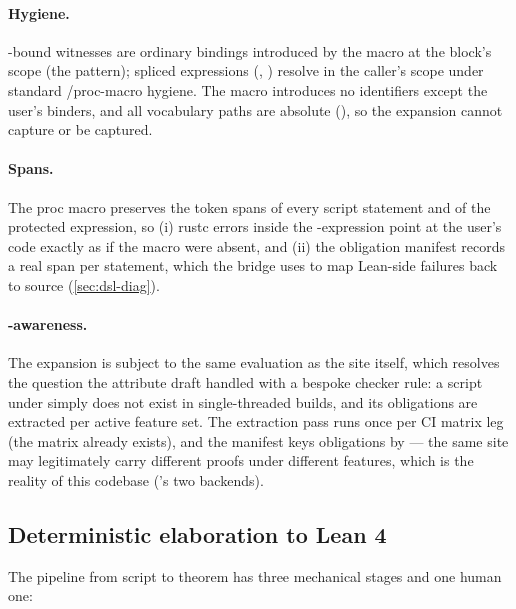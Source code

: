 \paragraph{Hygiene.} -bound witnesses are ordinary
 bindings introduced by the macro at the block's scope
(the   pattern); spliced expressions
(, ) resolve in the caller's scope
under standard /proc-macro hygiene. The macro
introduces no identifiers except the user's binders, and all
vocabulary paths are absolute (), so
the expansion cannot capture or be captured.

\paragraph{Spans.} The proc macro preserves the token spans of every
script statement and of the protected expression, so (i) rustc errors
inside the -expression point at the user's code exactly as
if the macro were absent, and (ii) the obligation manifest records a
real  span per statement, which the bridge uses to
map Lean-side failures back to source (\cref{sec:dsl-diag}).

\paragraph{-awareness.} The expansion is subject to the same
 evaluation as the site itself, which resolves the
question the attribute draft handled with a bespoke checker rule:
a script under \code{\#[cfg(feature = "multithreading")]} simply does
not exist in single-threaded builds, and its obligations are extracted
per active feature set. The extraction pass runs once per CI matrix
leg (the matrix already exists), and the manifest keys obligations by
 --- the same site may legitimately carry
different proofs under different features, which is the reality of
this codebase ('s two backends).

\subsection{Deterministic elaboration to Lean 4}
\label{sec:dsl-elab}

The pipeline from script to theorem has three mechanical stages and
one human one:

